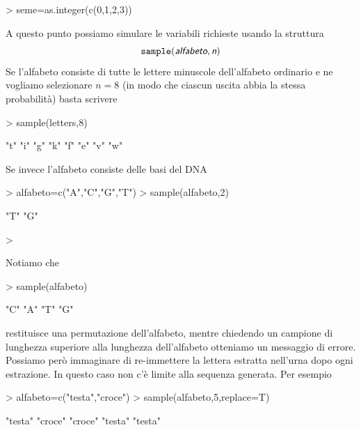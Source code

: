 \documentclass[onecolumn,11pt]{book}
\newcommand{\varia}[1]{\textsl{\textsf{#1}}}
\begin{document}
\begin{Schunk}
\begin{Sinput}
> seme=as.integer(c(0,1,2,3))
\end{Sinput}
\end{Schunk}
A questo punto possiamo simulare le variabili richieste usando la struttura
\begin{equation}\texttt{sample}(\varia{alfabeto},\varia{n})\end{equation}
Se l'alfabeto consiste di tutte le lettere minuscole dell'alfabeto ordinario e ne vogliamo selezionare $n=8$  (in modo che ciascun uscita abbia la stessa probabilit\`a)  basta scrivere
\begin{Schunk}
\begin{Sinput}
> sample(letters,8)
\end{Sinput}
\begin{Soutput}
[1] "t" "i" "g" "k" "f" "e" "v" "w"
\end{Soutput}
\end{Schunk}
  Se invece l'alfabeto consiste delle basi del DNA
\begin{Schunk}
\begin{Sinput}
> alfabeto=c("A","C","G","T")
> sample(alfabeto,2)
\end{Sinput}
\begin{Soutput}
[1] "T" "G"
\end{Soutput}
\begin{Sinput}
> 
\end{Sinput}
\end{Schunk}
Notiamo che  
\begin{Schunk}
\begin{Sinput}
>  sample(alfabeto)
\end{Sinput}
\begin{Soutput}
[1] "C" "A" "T" "G"
\end{Soutput}
\end{Schunk}
restituisce una permutazione dell'alfabeto, mentre chiedendo un campione di lunghezza superiore alla lunghezza dell'alfabeto otteniamo un messaggio di errore. Possiamo per\`o immaginare di re-immettere la lettera estratta nell'urna dopo ogni estrazione. In questo caso non c'\`e limite alla sequenza generata.
Per esempio
\begin{Schunk}
\begin{Sinput}
> alfabeto=c("testa","croce")
> sample(alfabeto,5,replace=T)
\end{Sinput}
\begin{Soutput}
[1] "testa" "croce" "croce" "testa" "testa"
\end{Soutput}
\end{Schunk}
\end{document}
